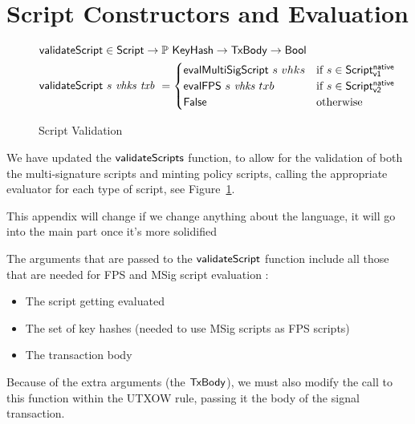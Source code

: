 \section{Script Constructors and Evaluation}
\label{sec:mps-lang}


\begin{figure}[htb]
  \begin{align*}
    \mathsf{validateScript} & \in\mathsf{Script}\to
    \mathbb{P}~\mathsf{KeyHash}\to\mathsf{TxBody}\to\mathsf{Bool} \\
    \mathsf{validateScript} & ~s~\mathit{vhks}~\mathit{txb}~=
                           \begin{cases}
                             \mathsf{evalMultiSigScript}~s~vhks & \text{if}~s \in\mathsf{Script^{native}_{v1}} \\
                             \mathsf{evalFPS}~s~\mathit{vhks} ~txb & \text{if}~s \in\mathsf{Script^{native}_{v2}} \\
                             \mathsf{False} & \text{otherwise}
                           \end{cases}
  \end{align*}
  \caption{Script Validation}
  \label{fig:functions-validate}
\end{figure}

We have updated the
$\mathsf{validateScripts}$ function, to allow for the validation of both the
multi-signature scripts and minting policy scripts, calling the appropriate
evaluator for each type of script, see Figure~\ref{fig:functions-validate}.

\begin{note}
  This appendix will change if we change anything about the language, it will go
  into the main part once it's more solidified
\end{note}

The arguments that are passed to the $\mathsf{validateScript}$ function include all those
that are needed for FPS and MSig script evaluation :

\begin{itemize}
\item The script getting evaluated
\item The set of key hashes (needed to use MSig scripts as FPS scripts)
\item The transaction body
\end{itemize}

Because of the extra arguments
(the $\mathsf{TxBody}$), we must also modify the call to this function
within the UTXOW rule, passing it the body of the signal transaction.

